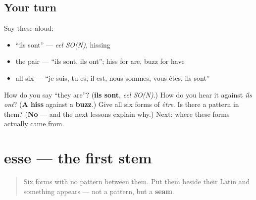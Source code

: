 \subsection*{Your turn}
Say these aloud:

\begin{itemize}
\raggedright
  \item \textquotedblleft{}ils sont\textquotedblright{} — \emph{eel SO(N)}, hissing
  \item the pair — \textquotedblleft{}ils sont, ils ont\textquotedblright{}; hiss for are, buzz for have
  \item all six — \textquotedblleft{}je suis, tu es, il est, nous sommes, vous êtes, ils sont\textquotedblright{}
\end{itemize}

\begin{tcolorbox}[breakable,colback=teal!4,colframe=teal!35!black,title={Before you move on}]
How do you say \textquotedblleft{}they are\textquotedblright{}? (\textbf{ils sont}, \emph{eel SO(N)}.) How do you hear it against \emph{ils ont}? (\textbf{A hiss} against a \textbf{buzz}.) Give all six forms of \emph{être}. Is there a pattern in them? (\textbf{No} — and the next lessons explain why.) Next: where these forms actually came from.
\end{tcolorbox}
\section[esse]{esse — the first stem}

\label{lesson:FR-C16-esse}



\begin{quote}
Six forms with no pattern between them. Put them beside their Latin and something appears — not a pattern, but a \textbf{seam}.
\end{quote}

